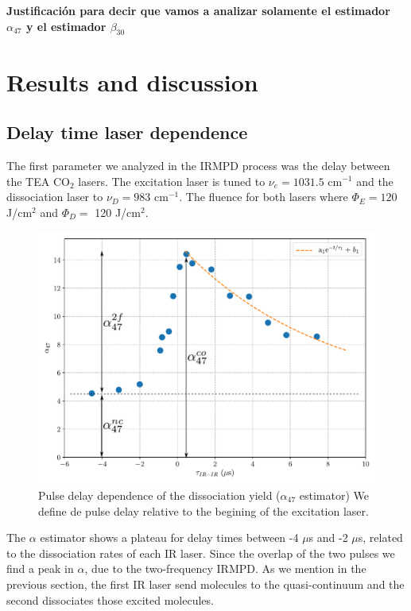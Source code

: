 \documentclass[global,twocolumn]{svjour}
\begin{document}
\textbf{Justificaci\'on para decir que vamos a analizar solamente el estimador $\alpha_{47}$ y el estimador $\beta_{30}$}
 
\section{Results and discussion}
\subsection{Delay time laser dependence}
The first parameter we analyzed in the IRMPD process was the delay between the TEA CO$_{2}$ lasers. The excitation laser is tuned to $\nu_{e}= 1031.5$ cm$^{−1}$ and the dissociation laser to $\nu_{D}=983$ cm$^{-1}$. The fluence for both lasers where $\Phi_{E}=120 $J/cm$^{2}$ and $\Phi_{D}=$ 120 J/cm$^{2}$. 

\begin{figure}[h]
	\includegraphics[width=1\linewidth]{figures/alfa_47_decaimiento.pdf}
	\caption{Pulse delay dependence of the dissociation yield ($\alpha_{47}$ estimator) We define de pulse delay relative to the begining of the excitation laser.}
	\label{fig:alpha_47_estimator}
\end{figure}

The $\alpha$ estimator shows a plateau for delay times between -4 $\mu$s and -2 $\mu$s, related to the dissociation rates of each IR laser. Since the overlap of the two pulses we find a peak in $\alpha$, due to the two-frequency IRMPD. As we mention in the previous section, the first IR laser send molecules to the quasi-continuum and the second dissociates those excited molecules.
\end{document}
